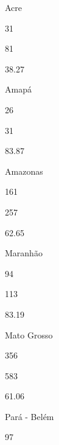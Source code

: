 \documentclass[
  letterpaper,
]{report}
\begin{document}
Acre

\n      

31

\n      

81

\n      

38.27

\n    

\n    

\n      

Amapá

\n      

26

\n      

31

\n      

83.87

\n    

\n    

\n      

Amazonas

\n      

161

\n      

257

\n      

62.65

\n    

\n    

\n      

Maranhão

\n      

94

\n      

113

\n      

83.19

\n    

\n    

\n      

Mato Grosso

\n      

356

\n      

583

\n      

61.06

\n    

\n    

\n      

Pará - Belém

\n      

97

\n      
\end{document}
